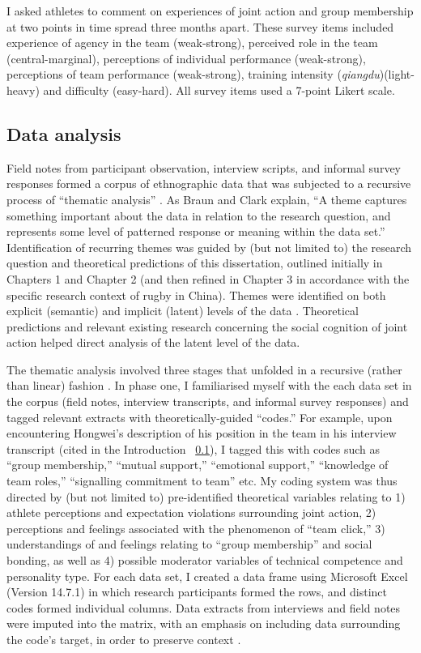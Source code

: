     I asked athletes to comment on experiences of joint action and group membership at two points in time spread three months apart.  These survey items included experience of agency in the team (weak-strong), perceived role in the team (central-marginal), perceptions of individual performance (weak-strong), perceptions of team performance (weak-strong), training intensity (\textit{qiangdu})(light-heavy) and difficulty (easy-hard).  All survey items used a 7-point Likert scale.


  \subsection{Data analysis}
  Field notes from participant observation, interview scripts, and informal survey responses formed a corpus of ethnographic data that was subjected to a recursive process of ``thematic analysis'' \citep{Braun2006}.  As Braun and Clark \textcite[10]{Braun2006} explain, ``A theme captures something important about the data in relation to the research question, and represents some level of patterned response or meaning within the data set.'' Identification of recurring themes was guided by (but not limited to) the research question and theoretical predictions of this dissertation, outlined initially in Chapters 1 and Chapter 2 (and then refined in Chapter 3 in accordance with the specific research context of rugby in China).  Themes were identified on both explicit (semantic) and implicit (latent) levels of the data \citep{Boyatzis1998}. Theoretical predictions and relevant existing research concerning the social cognition of joint action helped direct analysis of the latent level of the data.

  The thematic analysis involved three stages that unfolded in a recursive (rather than linear) fashion \citep{Braun2006}. In phase one, I familiarised myself with the each data set in the corpus (field notes, interview transcripts, and informal survey responses) and tagged relevant extracts with theoretically-guided ``codes.'' For example, upon encountering Hongwei's description of his position in the team in his interview transcript (cited in the Introduction ~\ref{}), I tagged this with codes such as ``group membership,'' ``mutual support,'' ``emotional support,'' ``knowledge of team roles,'' ``signalling commitment to team'' etc.  My coding system was thus directed by (but not limited to) pre-identified theoretical variables relating to 1) athlete perceptions and expectation violations surrounding joint action, 2) perceptions and feelings associated with the phenomenon of ``team click,'' 3) understandings of and feelings relating to ``group membership'' and social bonding, as well as 4) possible moderator variables of technical competence and personality type.  For each data set, I created a data frame using Microsoft Excel (Version 14.7.1) in which research participants formed the rows, and distinct codes formed individual columns. Data extracts from interviews and field notes were imputed into the matrix, with an emphasis on including data surrounding the code's target, in order to preserve context \citep[see][]{Bryman2001}.

